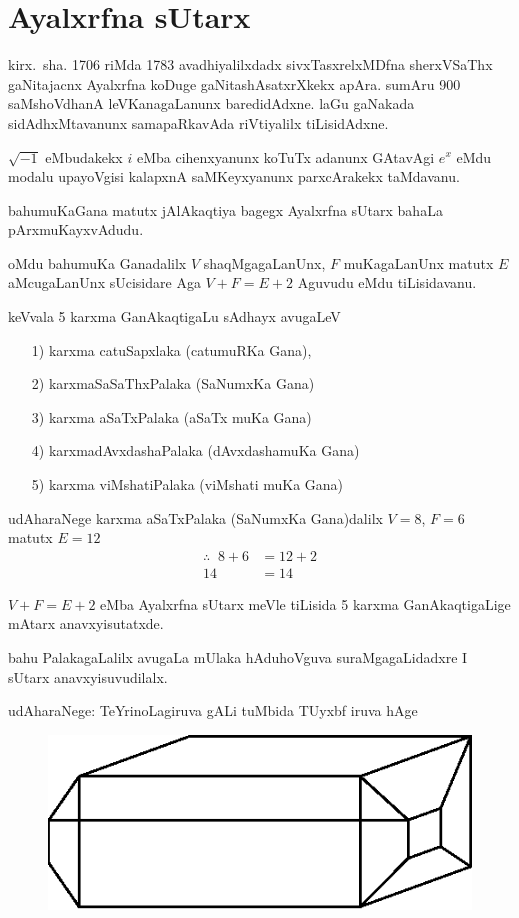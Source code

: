 \chapter{Ayalxrfna sUtarx}

\vskip -20pt

kirx.~sha. {\rm 1706} riMda {\rm 1783} avadhiyalilxdadx sivxTasxrelxMDfna sherxVSaThx gaNitajacnx Ayalxrfna koDuge gaNitashAsatxrXkekx apAra. sumAru {\rm 900} saMshoVdhanA leVKanagaLanunx baredidAdxne. laGu gaNakada sidAdhxMtavanunx samapaRkavAda riVtiyalilx tiLisidAdxne.

$\sqrt{-1}$ eMbudakekx $i$ eMba cihenxyanunx koTuTx adanunx GAtavAgi $e^x$ eMdu modalu upayoVgisi kalapxnA saMKeyxyanunx parxcArakekx taMdavanu.

bahumuKaGana matutx jAlAkaqtiya bagegx Ayalxrfna sUtarx bahaLa pArxmuKayxvAdudu.

oMdu bahumuKa Ganadalilx $V$ shaqMgagaLanUnx, $F$ muKagaLanUnx matutx $E$ aMcugaLanUnx sUcisidare Aga $V+F=E+2$ Aguvudu eMdu tiLisidavanu. 

keVvala {\rm 5} karxma GanAkaqtigaLu sAdhayx avugaLeV
\begin{enumerate}
\item[{\rm 1)}] karxma catuSapxlaka (catumuRKa Gana),
\item[{\rm 2)}] karxmaSaSaThxPalaka (SaNumxKa Gana)
\item[{\rm 3)}] karxma aSaTxPalaka (aSaTx muKa Gana)
\item[{\rm 4)}] karxmadAvxdashaPalaka (dAvxdashamuKa Gana)
\item[{\rm 5)}] karxma viMshatiPalaka (viMshati muKa Gana)
\end{enumerate}

udAharaNege karxma aSaTxPalaka (SaNumxKa Gana)dalilx \quad $V=8$, \quad $F=6$ matutx $E=12$ 
\begin{align*}
\therefore \;\; 8+6 &=12+2\\
14 &=14
\end{align*}

$V+F=E+2$ eMba Ayalxrfna sUtarx meVle tiLisida {\rm 5} karxma GanAkaqtigaLige mAtarx anavxyisutatxde.

bahu PalakagaLalilx avugaLa mUlaka hAduhoVguva suraMgagaLidadxre I sUtarx anavxyisuvudilalx.

udAharaNege: TeYrinoLagiruva gALi tuMbida TUyxbf iruva hAge
\begin{figure}[H]
\centering
\includegraphics{src/figures/m-147.eps}
\end{figure}

